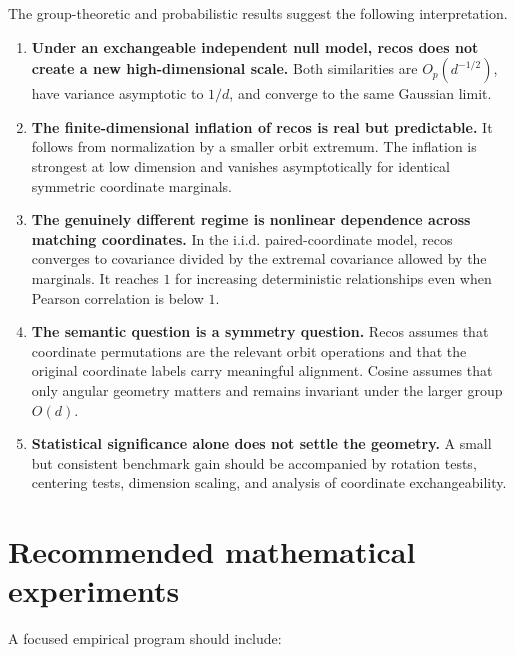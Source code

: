 \documentclass[11pt,a4paper]{article}
\begin{document}
The group-theoretic and probabilistic results suggest the following interpretation.

\begin{enumerate}[leftmargin=2em]
    \item \textbf{Under an exchangeable independent null model, recos does not create a new high-dimensional scale.} Both similarities are $O_p(d^{-1/2})$, have variance asymptotic to $1/d$, and converge to the same Gaussian limit.

    \item \textbf{The finite-dimensional inflation of recos is real but predictable.} It follows from normalization by a smaller orbit extremum. The inflation is strongest at low dimension and vanishes asymptotically for identical symmetric coordinate marginals.

    \item \textbf{The genuinely different regime is nonlinear dependence across matching coordinates.} In the i.i.d. paired-coordinate model, recos converges to covariance divided by the extremal covariance allowed by the marginals. It reaches $1$ for increasing deterministic relationships even when Pearson correlation is below $1$.

    \item \textbf{The semantic question is a symmetry question.} Recos assumes that coordinate permutations are the relevant orbit operations and that the original coordinate labels carry meaningful alignment. Cosine assumes that only angular geometry matters and remains invariant under the larger group $O(d)$.

    \item \textbf{Statistical significance alone does not settle the geometry.} A small but consistent benchmark gain should be accompanied by rotation tests, centering tests, dimension scaling, and analysis of coordinate exchangeability.
\end{enumerate}

\section{Recommended mathematical experiments}

A focused empirical program should include:
\end{document}
